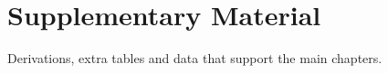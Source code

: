 \chapter{Supplementary Material}
\label{chap:appendix}

Derivations, extra tables and data that support the main chapters.
